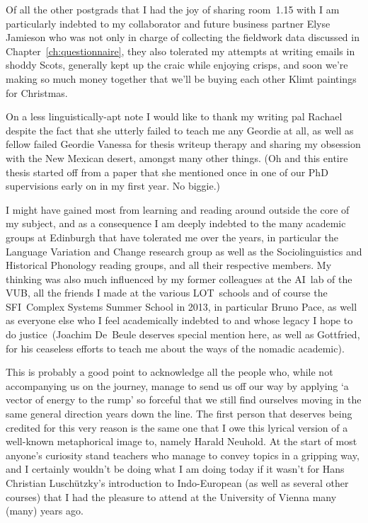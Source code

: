 \documentclass[twoside,10pt]{book}
\begin{document}
Of all the other postgrads that I had the joy of sharing room~1.15 with I am particularly indebted to my collaborator and future business partner Elyse Jamieson who was not only in charge of collecting the fieldwork data discussed in Chapter~\ref{ch:questionnaire}, they also tolerated my attempts at writing emails in shoddy Scots, generally kept up the craic while enjoying crisps, and soon we're making so much money together that we'll be buying each other Klimt paintings for Christmas.

On a less linguistically-apt note I would like to thank my writing pal Rachael despite the fact that she utterly failed to teach me any Geordie at all, as well as fellow failed Geordie Vanessa for thesis writeup therapy and sharing my obsession with the New Mexican desert, amongst many other things. (Oh and this entire thesis started off from a paper that she mentioned once in one of our PhD supervisions early on in my first year. No biggie.)

I might have gained most from learning and reading around outside the core of my subject, and as a consequence I am deeply indebted to the many academic groups at Edinburgh that have tolerated me over the years, in particular the Language Variation and Change research group as well as the Sociolinguistics and Historical Phonology reading groups, and all their respective members. My thinking was also much influenced by my former colleagues at the AI~lab of the VUB, all the friends I made at the various LOT~schools and of course the SFI~Complex Systems Summer School in 2013, in particular Bruno Pace, as well as everyone else who I feel academically indebted to and whose legacy I hope to do justice~(Joachim De~Beule deserves special mention here, as well as Gottfried, for his ceaseless efforts to teach me about the ways of the nomadic academic).

This is probably a good point to acknowledge all the people who, while not accompanying us on the journey, manage to send us off our way by applying `a vector of energy to the rump' so forceful that we still find ourselves moving in the same general direction years down the line.
The first person that deserves being credited for this very reason is the same one that I owe this lyrical version of a well-known metaphorical image to, namely Harald Neuhold. At the start of most anyone's curiosity stand teachers who manage to convey topics in a gripping way, and I certainly wouldn't be doing what I am doing today if it wasn't for Hans Christian Luschützky's introduction to Indo-European (as well as several other courses) that I had the pleasure to attend at the University of Vienna many (many) years ago.
\end{document}
